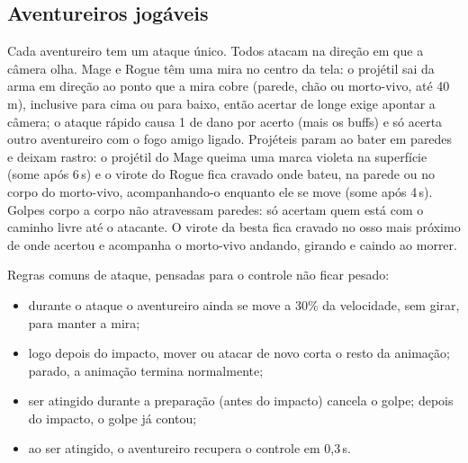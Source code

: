 \documentclass[11pt,a4paper]{article}
\begin{document}
\subsection{Aventureiros jogáveis}

Cada aventureiro tem um ataque único. Todos atacam na direção em que a câmera olha. Mage e Rogue têm uma mira no centro da tela: o projétil sai da arma em direção ao ponto que a mira cobre (parede, chão ou morto-vivo, até 40\,m), inclusive para cima ou para baixo, então acertar de longe exige apontar a câmera; o ataque rápido causa 1 de dano por acerto (mais os buffs) e só acerta outro aventureiro com o fogo amigo ligado. Projéteis param ao bater em paredes e deixam rastro: o projétil do Mage queima uma marca violeta na superfície (some após 6\,s) e o virote do Rogue fica cravado onde bateu, na parede ou no corpo do morto-vivo, acompanhando-o enquanto ele se move (some após 4\,s). Golpes corpo a corpo não atravessam paredes: só acertam quem está com o caminho livre até o atacante. O virote da besta fica cravado no osso mais próximo de onde acertou e acompanha o morto-vivo andando, girando e caindo ao morrer.

Regras comuns de ataque, pensadas para o controle não ficar pesado:
\begin{itemize}
    \item durante o ataque o aventureiro ainda se move a 30\% da velocidade, sem girar, para manter a mira;
    \item logo depois do impacto, mover ou atacar de novo corta o resto da animação; parado, a animação termina normalmente;
    \item ser atingido durante a preparação (antes do impacto) cancela o golpe; depois do impacto, o golpe já contou;
    \item ao ser atingido, o aventureiro recupera o controle em 0,3\,s.
\end{itemize}
\end{document}

